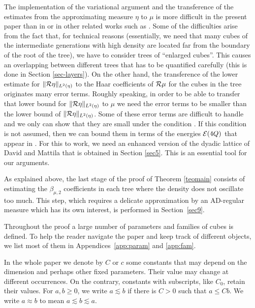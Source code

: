 The implementation of the variational argument and the transference of the estimates from the approximating measure $\eta$ to $\mu$ is more difficult in the present
paper than in \cite{Reguera-Tolsa} or in other related works such as \cite{JNRT}. Some of the
difficulties arise from the fact that, for technical reasons (essentially, we need that many cubes of 
the intermediate generations with high density are located far from the boundary of the root of the tree), we have to consider trees of ``enlarged cubes''. This causes an overlapping between different trees that
has to be quantified carefully (this is done in Section \ref{sec-layers}). 
On the other hand, the transference of the lower estimate for $\|{\mathcal R}\eta\|_{L^2(\eta)}$ 
to the Haar coefficients of ${\mathcal R}\mu$ for the cubes in the tree originates many error terms. Roughly speaking, in
order to be able to transfer that lower bound for $\|{\mathcal R}\eta\|_{L^2(\eta)}$ to $\mu$ we need
the error terms to be smaller than the lower bound of $\|{\mathcal R}\eta\|_{L^2(\eta)}$. Some of these
error terms are difficult to handle and we only can show that they are small under the condition . If this condition is not assumed, then we can bound them in terms of the 
energies ${\mathcal E}(4Q)$ that appear in . For this to work, we need 
an enhanced version of the dyadic lattice of David and Mattila that is obtained in Section
\ref{sec5}. This is an essential tool for our arguments.

As explained above, the last stage of the proof of Theorem \ref{teomain} consists of estimating the 
$\beta_{\mu,2}$ coefficients in each tree where the density does not oscillate too much.
This step, which requires a delicate approximation by an AD-regular measure which has its own interest,
is performed in Section~\ref{sec9}.

Throughout the proof a large number of parameters and families of cubes is defined. To help the reader navigate the paper and keep track of different objects, we list most of them in Appendices~\ref{app:param} and \ref{app:fam}.

\vv

In the whole paper we denote by $C$ or $c$ some constants that may depend on the dimension and perhaps other fixed parameters. Their value may change at different occurrences. On the contrary, constants with subscripts, like $C_0$, retain their values.
For $a,b\geq 0$, we write $a\lesssim b$ if there is $C>0$ such that $a\leq Cb$. We write $a\approx b$ to mean $a\lesssim b\lesssim a$. 

\vv

